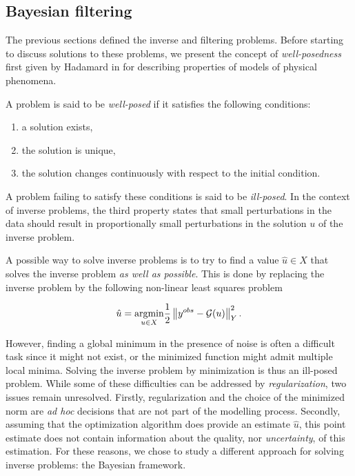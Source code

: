\subsection{Bayesian filtering}

The previous sections defined the inverse and filtering problems. Before starting to discuss solutions to these problems, we present the concept of \textit{well-posedness} first given by Hadamard in \cite{hadamard} for describing properties of models of physical phenomena.

\begin{definition} A problem is said to be \textit{well-posed} if it satisfies the following conditions:
  \begin{enumerate}
  \item{a solution exists,}
  \item{the solution is unique,}
  \item{the solution changes continuously with respect to the initial condition.}
  \end{enumerate}

  A problem failing to satisfy these conditions is said to be \textit{ill-posed}. In the context of inverse problems, the third property states that small perturbations in the data should result in proportionally small perturbations in the solution $u$ of the inverse problem.  
\end{definition}

A possible way to solve inverse problems is to try to find a value $\hat u \in X$ that solves the inverse problem \textit{as well as possible}. This is done by replacing the inverse problem by the following non-linear least squares problem

\begin{equation*}
  \hat u = \underset{u \in X}{\text{argmin}} \frac12\left\lVert y^{obs} - \mathcal{G}(u) \right\rVert_Y^2.
\end{equation*}

However, finding a global minimum in the presence of noise is often a difficult task since it might not exist, or the minimized function might admit multiple local minima. Solving the inverse problem by minimization is thus an ill-posed problem. While some of these difficulties can be addressed by \textit{regularization}, two issues remain unresolved. Firstly, regularization and the choice of the minimized norm are \textit{ad hoc} decisions that are not part of the modelling process. Secondly, assuming that the optimization algorithm does provide an estimate $\hat u$, this point estimate does not contain information about the quality, nor \textit{uncertainty}, of this estimation. For these reasons, we chose to study a different approach for solving inverse problems: the Bayesian framework.


